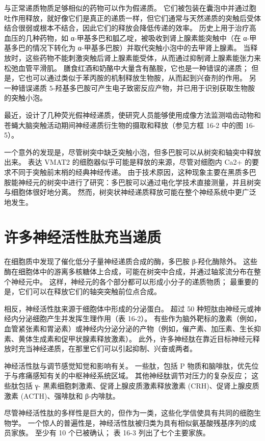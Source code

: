 与正常递质物质足够相似的药物可以作为假递质。 
它们被包装在囊泡中并通过胞吐作用释放，就好像它们是真正的递质一样，但它们通常与天然递质的突触后受体结合很弱或根本不结合，因此它们的释放会降低传递的效率。 
历史上用于治疗高血压的几种药物，如 α-甲基多巴和胍乙啶，被吸收到肾上腺素能突触中（在 α-甲基多巴的情况下转化为 α-甲基多巴胺）并取代突触小泡中的去甲肾上腺素。 
当释放时，这些药物不能刺激突触后肾上腺素能受体，从而通过抑制肾上腺素能张力来松弛血管平滑肌。 
膳食红酒和奶酪中大量含有酪胺，它也是一种错误的递质； 
但是，它也可以通过类似于苯丙胺的机制释放生物胺，从而起到兴奋剂的作用。 
另一种错误递质 5-羟基多巴胺可产生电子致密反应产物，并已用于识别获取生物胺的突触小泡。


最近，设计了几种荧光假神经递质，使研究人员能够使用成像方法监测啮齿动物和苍蝇大脑突触活动期间神经递质衍生物的摄取和释放（参见方框 16-2 中的图 16-5）。


一个意外的发现是，尽管树突中缺乏突触小泡，但多巴胺可以从树突和轴突中释放出来。 
表达 VMAT2 的细胞器似乎可能是释放的来源，尽管对细胞内 Ca2+ 的要求不同于突触前末梢的经典神经传递。 
由于技术原因，这种现象主要在黑质多巴胺能神经元的树突中进行了研究：多巴胺可以通过电化学技术直接测量，并且树突与细胞体很好地分离。 
然而，树突状神经递质释放可能在整个神经系统中更广泛地发生。



\section{许多神经活性肽充当递质}

在细胞质中发现了催化低分子量神经递质合成的酶，多巴胺 β-羟化酶除外。 
这些酶在细胞体中的游离多核糖体上合成，可能在树突中合成，并通过轴浆流分布在整个神经元中。 
这样，神经元的各个部分都可以形成小分子的递质物质； 最重要的是，它们可以在释放它们的轴突突触前位点合成。


相反，神经活性肽来源于细胞体中形成的分泌蛋白。 
超过 50 种短肽由神经元或神经内分泌细胞产生并发挥生理作用（表 16-2）。 
有些作为脑外靶标的激素（例如，血管紧张素和胃泌素）或神经内分泌分泌的产物（例如，催产素、加压素、生长抑素、黄体生成素和促甲状腺素释放激素）。 
此外，许多神经肽在靠近目标神经元释放时充当神经递质，在那里它们可以引起抑制、兴奋或两者。


神经活性肽与调节感觉知觉和影响有关。 
一些肽，包括 P 物质和脑啡肽，优先位于与疼痛感知有关的中枢神经系统区域。 
其他神经肽调节对压力的复杂反应； 这些肽包括 γ- 黑素细胞刺激素、促肾上腺皮质激素释放激素 (CRH)、促肾上腺皮质激素 (ACTH)、强啡肽和 β-内啡肽。


尽管神经活性肽的多样性是巨大的，但作为一类，这些化学信使具有共同的细胞生物学。 
一个惊人的普遍性是，神经活性肽被归类为具有相似氨基酸残基序列的成员家族。 
至少有 10 个已被确认； 表 16-3 列出了七个主要家族。



